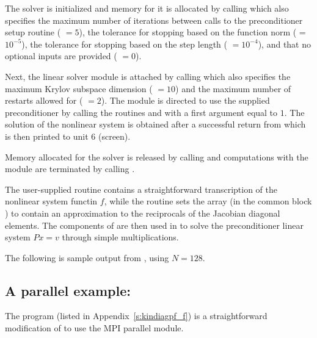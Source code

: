 The {\kinsol} solver is initialized and memory for it is allocated by
calling  which also specifies the maximum number of 
iterations between calls to the preconditioner setup routine ( $=5$),
the tolerance for stopping based on the function norm ( = $10^{-5}$),
the tolerance for stopping based on the step length ( $=10^{-4}$),
and that no optional inputs are provided ( $=0$).

Next, the {\kinspgmr} linear solver module is attached by calling  
which also specifies the maximum Krylov subspace dimension ( $=10$) and the
maximum number of restarts allowed for {\spgmr} ( $=2$).
The {\kinspgmr} module is directed to use the supplied preconditioner by 
calling the routines  and  with
a first argument equal to $1$. The solution of the nonlinear system is obtained after
a successful return from  which is then printed to unit 6 (screen).

Memory allocated for the {\kinsol} solver is released by calling  and
computations with the {\nvecs} module are terminated by calling .

The user-supplied routine  contains a straightforward transcription
of the nonlinear system functin $f$, while the routine  sets the
array  (in the common block ) to contain an approximation to 
the reciprocals of the Jacobian diagonal elements. The components of  are
then used in  to solve the preconditioner linear system $Px=v$
through simple multiplications.

The following is sample output from , using $N = 128$.

\vspace{0.1in}


\subsection{A parallel example: }\label{ss:kindiagpf}

The program  (listed in Appendix~\ref{s:kindiagpf_f}) is a
straightforward modification of  to use the MPI parallel
{\nvecp} module.

